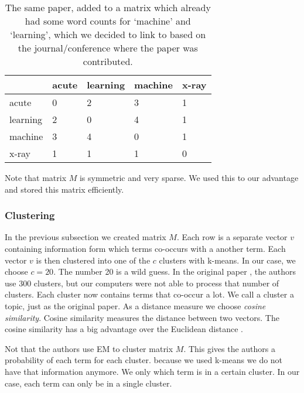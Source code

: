 \begin{table}
	\begin{center}

\begin{tabular}{|l|l|l|l|l|}
\hline
	 	& acute  & learning & machine &  x-ray \\ \hline
acute 	&	0 	& 	2 &	 3 &  1	 \\ \hline
learning&	2	&	0 &	 4 &  1	 \\ \hline
machine &	3	&	4 &	 0 &  1	 \\ \hline
x-ray	&	1	&	1 &	 1 &  0	 \\ \hline
\end{tabular} 

	\end{center}
\caption{The same paper, added to a matrix which already had some word counts for `machine' and `learning', which we decided to link to based on the journal/conference where the paper was contributed.}
	\label{tab:after}
\end{table}

Note that matrix $M$ is symmetric and very sparse. We used this to our advantage and stored this matrix efficiently.


\subsubsection*{Clustering}

In the previous subsection we created matrix $M$. Each row is a separate vector $v$ containing information form which terms co-occurs with a another term. Each vector $v$ is then clustered into one of the $c$ clusters with k-means. In our case, we choose  $c = 20$. The number 20 is a wild guess. In the original paper \cite{steyvers2004probabilistic}, the authors use 300 clusters, but our computers were not able to process that number of clusters. Each cluster now contains terms that co-occur a lot. We call a cluster a topic, just as the original paper. As a distance measure we choose \emph{cosine similarity}. Cosine similarity measures the distance between two vectors. The cosine similarity has a big advantage over the Euclidean distance \cite{chowdhury2010introduction}.  

Not that the authors use EM to cluster matrix $M$. This gives the authors a probability of each term for each cluster. because we used k-means we do not have that information anymore. We only which term is in a certain cluster. In our case, each term can only be in a single cluster.

